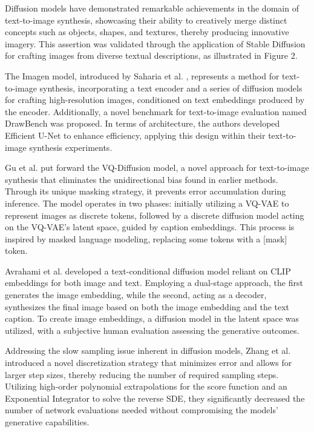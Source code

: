 Diffusion models have demonstrated remarkable achievements in the domain of text-to-image synthesis, showcasing their ability to creatively merge distinct concepts such as objects, shapes, and textures, thereby producing innovative imagery. This assertion was validated through the application of Stable Diffusion \cite{rombach2022highresolution} for crafting images from diverse textual descriptions, as illustrated in Figure 2.

The Imagen model, introduced by Saharia et al. \cite{saharia2022photorealistic}, represents a method for text-to-image synthesis, incorporating a text encoder and a series of diffusion models for crafting high-resolution images, conditioned on text embeddings produced by the encoder. Additionally, a novel benchmark for text-to-image evaluation named DrawBench was proposed. In terms of architecture, the authors developed Efficient U-Net to enhance efficiency, applying this design within their text-to-image synthesis experiments.

Gu et al. \cite{gu2022vector} put forward the VQ-Diffusion model, a novel approach for text-to-image synthesis that eliminates the unidirectional bias found in earlier methods. Through its unique masking strategy, it prevents error accumulation during inference. The model operates in two phases: initially utilizing a VQ-VAE to represent images as discrete tokens, followed by a discrete diffusion model acting on the VQ-VAE's latent space, guided by caption embeddings. This process is inspired by masked language modeling, replacing some tokens with a [mask] token.

Avrahami et al. \cite{avrahami2022blended} developed a text-conditional diffusion model reliant on CLIP \cite{radford2021learning} embeddings for both image and text. Employing a dual-stage approach, the first generates the image embedding, while the second, acting as a decoder, synthesizes the final image based on both the image embedding and the text caption. To create image embeddings, a diffusion model in the latent space was utilized, with a subjective human evaluation assessing the generative outcomes.

Addressing the slow sampling issue inherent in diffusion models, Zhang et al. \cite{zhang2022fast} introduced a novel discretization strategy that minimizes error and allows for larger step sizes, thereby reducing the number of required sampling steps. Utilizing high-order polynomial extrapolations for the score function and an Exponential Integrator to solve the reverse SDE, they significantly decreased the number of network evaluations needed without compromising the models' generative capabilities.

